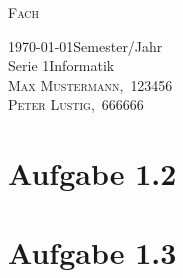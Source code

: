 \documentclass[a4paper, fontsize=10pt]{scrartcl}
\newcommand{\header}[1]{\begin{center}\Huge\textsc{{\color{uzl-blue}#1}}\end{center}}
\newcommand{\semester}[1]{\today\hfill#1\\[0.2 cm]}
\newcommand{\topic}[2]{\Large{\color{uzl-orange}#1\hfill\large#2}\\[0.2cm] }
\newcommand{\student}[2]{\small{\textsc{#1},~\textsc{#2}}}
\begin{document}
\header{Fach}
\semester{Semester/Jahr}
\topic{Serie 1}{Informatik}
\student{Max Mustermann}{123456} \\
\student{Peter Lustig}{666666}

	\section*{Aufgabe 1.2}

	\section*{Aufgabe 1.3}
\end{document}
